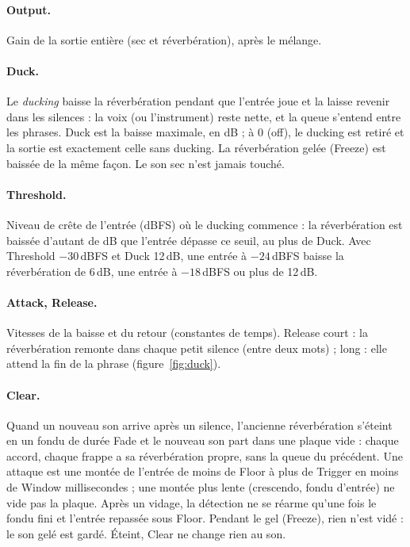 \documentclass[a4paper,11pt]{article}
\newcommand{\dB}{\,dB}
\newcommand{\dBFS}{\,dBFS}
\begin{document}
\paragraph{Output.} Gain de la sortie entière (sec et réverbération), après le mélange.

\paragraph{Duck.} Le \emph{ducking} baisse la réverbération pendant que l'entrée joue et la
laisse revenir dans les silences : la voix (ou l'instrument) reste nette, et la queue s'entend
entre les phrases. Duck est la baisse maximale, en dB ; à 0 (\og off\fg), le ducking est
retiré et la sortie est exactement celle sans ducking. La réverbération gelée (Freeze) est
baissée de la même façon. Le son sec n'est jamais touché.

\paragraph{Threshold.} Niveau de crête de l'entrée (dBFS) où le ducking commence : la
réverbération est baissée d'autant de dB que l'entrée dépasse ce seuil, au plus de Duck. Avec
Threshold $-30$\dBFS{} et Duck 12\dB, une entrée à $-24$\dBFS{} baisse la réverbération de
6\dB, une entrée à $-18$\dBFS{} ou plus de 12\dB.

\paragraph{Attack, Release.} Vitesses de la baisse et du retour (constantes de temps). Release
court : la réverbération remonte dans chaque petit silence (entre deux mots) ; long : elle
attend la fin de la phrase (figure~\ref{fig:duck}).

\paragraph{Clear.} Quand un nouveau son arrive après un silence, l'ancienne réverbération
s'éteint en un fondu de durée Fade et le nouveau son part dans une plaque vide : chaque accord,
chaque frappe a sa réverbération propre, sans la queue du précédent. Une attaque est une montée
de l'entrée de moins de Floor à plus de Trigger en moins de Window millisecondes ; une montée
plus lente (crescendo, fondu d'entrée) ne vide pas la plaque. Après un vidage, la détection ne se réarme
qu'une fois le fondu fini et l'entrée repassée sous Floor. Pendant le gel (Freeze), rien n'est
vidé : le son gelé est gardé. Éteint, Clear ne change rien au son.
\end{document}
